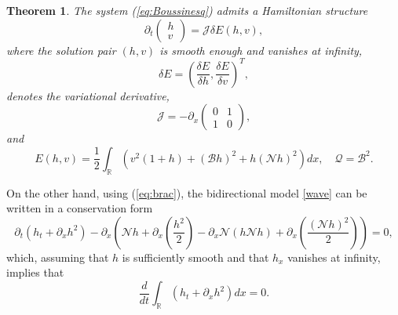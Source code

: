 \documentclass[final,11pt,a4paper,reqno]{amsart}
\newcommand{\RR}{\mathbb R}
\newtheorem{theorem}{Theorem}
\theoremstyle{definition}
\begin{document}
\begin{theorem}
The system (\ref{eq:Boussinesq}) admits a Hamiltonian structure
\begin{equation*}
\partial_{t}\begin{pmatrix}h\\ v\end{pmatrix}=\mathscr{J}\delta E(h,v),
\end{equation*}
where the solution pair $(h,v)$ is smooth enough and vanishes at infinity,
$$\delta E=\left(\frac{\delta E}{\delta h},\frac{\delta E}{\delta v}\right)^{T},$$ denotes the variational derivative,
$$\mathscr{J}=-\partial_{x}\begin{pmatrix}0&1\\ 1&0\end{pmatrix},$$
and
\begin{equation*}
E(h,v)=\frac{1}{2}\int_{\RR}\left(v^{2}(1+h)+(\mathscr{B}h)^{2}+h(\mathscr{N}h)^{2}\right)dx,\quad \mathscr{Q}=\mathscr{B}^{2}.
\end{equation*}
\end{theorem}
On the other hand, using (\ref{eq:brac}), the bidirectional model \eqref{wave} can be written in a conservation form
\begin{equation*}
\partial_{t}(h_{t}+\partial_{x}h^{2})-\partial_{x}\left(\mathscr{N}h+\partial_{x}\left(\frac{h^{2}}{2}\right)-\partial_{x}\mathscr{N}(h\mathscr{N}h)+\partial_{x}\left(\frac{(\mathscr{N}h)^{2}}{2}\right)\right)=0,
\end{equation*} 
which, assuming that $h$ is sufficiently smooth and that $h_{x}$ vanishes at infinity, implies that
$$\frac{d}{dt}\int_{\mathbb{R}}(h_{t}+\partial_{x}h^{2})dx=0.$$ 
\end{document}
